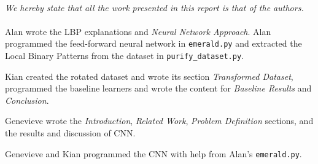 \newpage
\begin{multicols}{2}
\paragraph*{} \lettrine[nindent=0em,lines=1]{\textit{W}}{}\textit{e hereby state that all the work presented in this report is that of the authors. }
\paragraph*{} Alan wrote the LBP explanations and \emph{Neural Network Approach}. Alan programmed the feed-forward neural network in \texttt{emerald.py} and extracted the Local Binary Patterns from the dataset in \texttt{purify\_dataset.py}. 
\par Kian created the rotated dataset and wrote its section \emph{Transformed Dataset}, programmed the baseline learners and wrote the content for \emph{Baseline Results} and \emph{Conclusion}. 
\par Genevieve wrote the \emph{Introduction}, \emph{Related Work}, \emph{Problem Definition} sections, and the results and discussion of CNN.
\par Genevieve and Kian programmed the CNN with help from Alan's \texttt{emerald.py}. 



\end{multicols}

